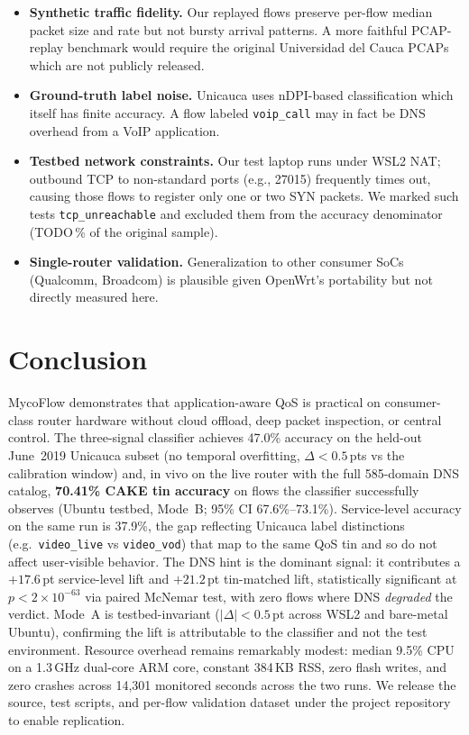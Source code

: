 \documentclass[journal,onecolumn]{IEEEtran}
\begin{document}
\begin{itemize}
\item \textbf{Synthetic traffic fidelity.} Our replayed flows preserve
per-flow median packet size and rate but not bursty arrival patterns.
A more faithful PCAP-replay benchmark would require the original
Universidad del Cauca PCAPs which are not publicly released.
\item \textbf{Ground-truth label noise.} Unicauca uses nDPI-based
classification which itself has finite accuracy. A flow labeled
\texttt{voip\_call} may in fact be DNS overhead from a VoIP application.
\item \textbf{Testbed network constraints.} Our test laptop runs under
WSL2 NAT; outbound TCP to non-standard ports (e.g., 27015) frequently
times out, causing those flows to register only one or two SYN packets.
We marked such tests \texttt{tcp\_unreachable} and excluded them from the
accuracy denominator (TODO\,\% of the original sample).
\item \textbf{Single-router validation.} Generalization to other consumer
SoCs (Qualcomm, Broadcom) is plausible given OpenWrt's portability but
not directly measured here.
\end{itemize}

\section{Conclusion}
\label{sec:conclusion}

MycoFlow demonstrates that application-aware QoS is practical on
consumer-class router hardware without cloud offload, deep packet
inspection, or central control. The three-signal classifier achieves
47.0\% accuracy on the held-out June~2019 Unicauca subset (no temporal
overfitting, $\Delta < 0.5$\,pts vs the calibration window) and, in
vivo on the live router with the full 585-domain DNS catalog,
\textbf{70.41\% CAKE tin accuracy} on flows the classifier successfully
observes (Ubuntu testbed, Mode~B; 95\% CI 67.6\%--73.1\%). Service-level
accuracy on the same run is 37.9\%, the gap reflecting Unicauca label
distinctions (e.g.\ \texttt{video\_live} vs \texttt{video\_vod}) that
map to the same QoS tin and so do not affect user-visible behavior.
The DNS hint is the dominant signal: it contributes a $+17.6$\,pt
service-level lift and $+21.2$\,pt tin-matched lift, statistically
significant at $p < 2\!\times\!10^{-63}$ via paired McNemar test, with
zero flows where DNS \emph{degraded} the verdict. Mode~A is testbed-invariant ($|\Delta| < 0.5$\,pt across WSL2
and bare-metal Ubuntu), confirming the lift is attributable to the
classifier and not the test environment. Resource overhead remains
remarkably modest: median 9.5\% CPU on a 1.3\,GHz dual-core ARM core,
constant 384\,KB RSS, zero flash writes, and zero crashes across
14{,}301 monitored seconds across the two runs. We release the
source, test scripts, and per-flow validation dataset under the
project repository to enable replication.
\end{document}
